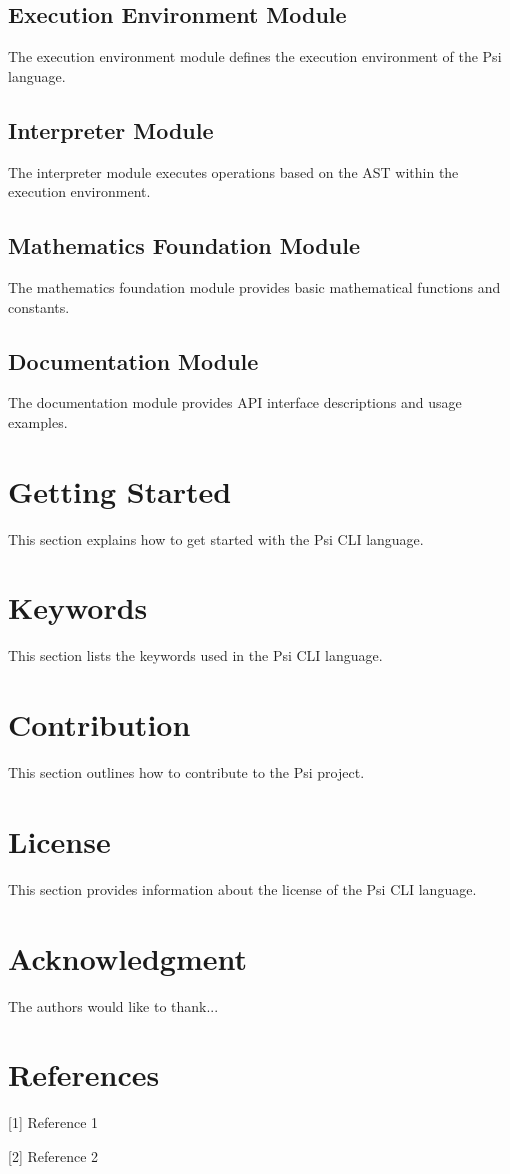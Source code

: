 \documentclass[conference]{IEEEtran}
\begin{document}
\subsection{Execution Environment Module}
The execution environment module defines the execution environment of the Psi language.

\subsection{Interpreter Module}
The interpreter module executes operations based on the AST within the execution environment.

\subsection{Mathematics Foundation Module}
The mathematics foundation module provides basic mathematical functions and constants.

\subsection{Documentation Module}
The documentation module provides API interface descriptions and usage examples.

\section{Getting Started}
This section explains how to get started with the Psi CLI language.

\section{Keywords}
This section lists the keywords used in the Psi CLI language.

\section{Contribution}
This section outlines how to contribute to the Psi project.

\section{License}
This section provides information about the license of the Psi CLI language.

\section*{Acknowledgment}
The authors would like to thank...

\section*{References}
[1] Reference 1

[2] Reference 2
\end{document}
